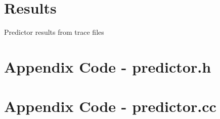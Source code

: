 \documentclass[twocolumn]{article}
\begin{document}










\onecolumn
\section{Results}
Predictor results from trace files


\section{Appendix Code - predictor.h}

\section{Appendix Code - predictor.cc}

\end{document}
